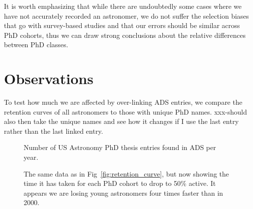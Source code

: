 \documentclass[preprint2]{aastex}
\begin{document}


It is worth emphasizing that while there are undoubtedly some cases where we have not accurately recorded an astronomer, we do not suffer the selection biases that go with survey-based studies and that our errors should be similar across PhD cohorts, thus we can draw strong conclusions about the relative differences between PhD classes.

\section{Observations}

To test how much we are affected by over-linking ADS entries, we compare the retention curves of all astronomers to those with unique PhD names.  xxx-should also then take the unique names and see how it changes if I use the last entry rather than the last linked entry.


\begin{figure}
  \caption{Number of US Astronomy PhD thesis entries found in ADS per year. \label{fig:phdperyear}}
\end{figure}


\begin{figure*}
  \caption{The fraction of Astronomy PhDs still active as first authors.  Error bars show ranges computed by comparing the curves to those of just authors with unique names and unique names where all records are assumed to be linked.   \label{fig:retention_curve}}
\end{figure*}

\begin{figure}
\caption{The same data as in Fig~\ref{fig:retention_curve}, but now showing the time it has taken for each PhD cohort to drop to 50\% active.  It appears we are losing young astronomers four times faster than in 2000.  \label{fig:retention_50}}
\end{figure}
\end{document}
